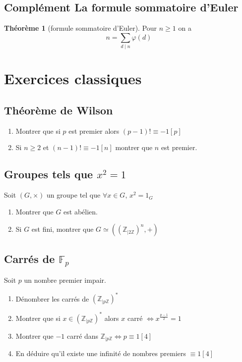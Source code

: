 \documentclass[10pt,a4paper]{article}
\theoremstyle{definition}
\newtheorem{theorem}[proposition]{Théorème}
\begin{document}
\subsection{Complément La formule sommatoire d'Euler}
\begin{theorem}[formule sommatoire d'Euler]
Pour $n \geq 1$ on a
\[ n = \sum_{d \mid n} \varphi(d) \]
\end{theorem}

\section{Exercices classiques}
\subsection{Théorème de Wilson}
\begin{enumerate}
\item Montrer que si $p$ est premier alors $(p - 1)! \equiv -1 [p]$
\item Si $n \geq 2$ et $(n - 1)! \equiv -1[n]$ montrer que $n$ est premier.
\end{enumerate}

\subsection{Groupes tels que $x^2 = 1$}
\noindent Soit $(G, \times)$ un groupe tel que $\forall x \in G$, $x^2 = 1_G$
\begin{enumerate}
\item Montrer que $G$ est abélien.
\item Si $G$ est fini, montrer que $G \simeq \left( (\mathbb{Z}_{|2\mathbb{Z}})^n, + \right)$
\end{enumerate}

\subsection{Carrés de $\mathbb{F}_p$}
\noindent Soit $p$ un nombre premier impair.
\begin{enumerate}
\item Dénombrer les carrés de $(\mathbb{Z}_{|p\mathbb{Z}})^*$
\item Montrer que si $x \in (\mathbb{Z}_{|p\mathbb{Z}})^*$ alors $x$ carré $\iff x^{\frac{p - 1}{2}} = 1$
\item Montrer que $-1$ carré dans $\mathbb{Z}_{|p\mathbb{Z}} \iff p \equiv 1 [4]$
\item En déduire qu'il existe une infinité de nombres premiers $\equiv 1 [4]$
\end{enumerate}
\end{document}
